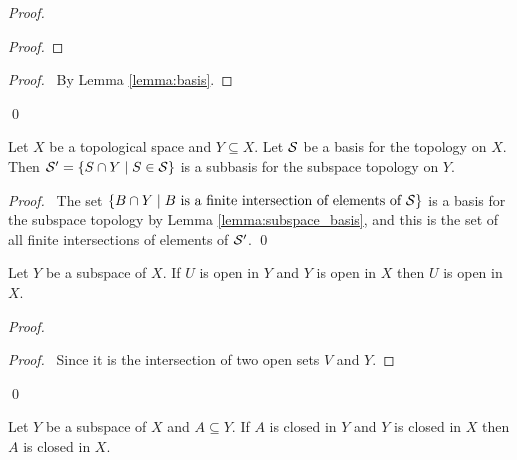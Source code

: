 \begin{proof}
    \pf
    \begin{proof}
    \end{proof}
    \qedstep
    \begin{proof}
        \pf\ By Lemma \ref{lemma:basis}.
    \end{proof}
    \qed
\end{proof}

\begin{lemma}
    \label{lemma:subspace_subbasis}
    Let $X$ be a topological space and $Y \subseteq X$. Let $\mathcal{S}$ be a basis for the topology on $X$.
    Then $\mathcal{S}' = \{ S \cap Y \mid S \in \mathcal{S} \}$ is a subbasis for the subspace topology on $Y$.
\end{lemma}

\begin{proof}
    \pf\ The set $\{ B \cap Y \mid B \text{ is a finite intersection of elements of } \mathcal{S} \}$ is a basis
    for the subspace topology by Lemma \ref{lemma:subspace_basis}, and this is the set of all finite
    intersections of elements of $\mathcal{S}'$. \qed
\end{proof}

\begin{lemma}
    \label{lemma:subspace_open}
    Let $Y$ be a subspace of $X$. If $U$ is open in $Y$ and $Y$ is open in $X$ then $U$ is open in $X$.
\end{lemma}

\begin{proof}
    \pf
    \begin{proof}
        \pf\ Since it is the intersection of two open sets $V$ and $Y$.
    \end{proof}
    \qed
\end{proof}

\begin{theorem}
    \label{theorem:closed_subspace}
    Let $Y$ be a subspace of $X$ and $A \subseteq Y$. If $A$ is closed in $Y$ and $Y$ is closed in $X$
    then $A$ is closed in $X$.
\end{theorem}

